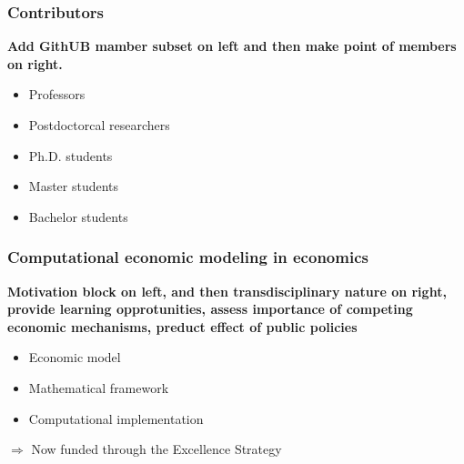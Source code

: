 \begin{frame}\frametitle{Contributors}

\textbf{Add GithUB mamber subset on left and then make point of members on right.}

  \begin{itemize}\setlength\itemsep{1em}
		\item Professors
		\item Postdoctorcal researchers
		\item Ph.D. students
    \item Master students
    \item Bachelor students
	\end{itemize}\vspace{0.3cm}


\end{frame}
\begin{frame}\frametitle{Computational economic modeling in economics}

\textbf{Motivation block on left, and then transdisciplinary nature on right, provide learning opprotunities, assess importance of competing economic mechanisms, preduct effect of public policies}

\vspace{0.3cm}\vspace{0.3cm}

	\begin{itemize}\setlength\itemsep{1em}
		\item Economic model
		\item Mathematical framework
		\item Computational implementation
	\end{itemize}\vspace{0.3cm}

\pause

$\Rightarrow$ Now funded through the \alert{Excellence Strategy}

\end{frame}
